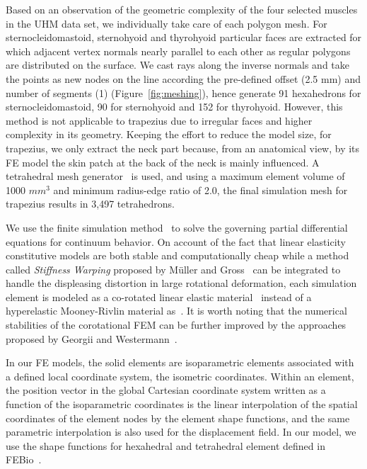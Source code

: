Based on an observation of the geometric complexity of the four selected muscles in the UHM data set, we individually take care of each polygon mesh. For sternocleidomastoid, sternohyoid and thyrohyoid particular faces are extracted for which adjacent vertex normals
nearly parallel to each other as regular polygons are distributed on the surface. We cast rays along the inverse normals and take the points as new nodes on the line according the pre-defined offset (2.5 mm) and number of segments (1) (Figure~\ref{fig:meshing}), hence generate 91 hexahedrons for sternocleidomastoid, 90 for sternohyoid and 152 for thyrohyoid. However, this method is not applicable to trapezius due to irregular faces and higher complexity in its geometry. Keeping the effort to reduce the model size, for trapezius, we only extract the neck part because, from an anatomical view, by its FE model the skin patch at the back of the neck is mainly influenced. A tetrahedral mesh generator~\cite{Si:2006:quality} is used, and using a maximum element volume of 1000 $mm^{3}$ and minimum radius-edge ratio of 2.0, the final simulation mesh for trapezius results in 3,497 tetrahedrons.

We use the finite simulation method~\cite{Cook:1995:finite} to solve the governing partial differential equations for continuum behavior. On account of the fact that linear elasticity constitutive models are both stable and computationally cheap while a method called \emph{Stiffness Warping} proposed by M\"{u}ller and Gross~\cite{Muller:2004:IVM} can be integrated to handle the displeasing distortion in large rotational deformation, each simulation element is modeled as a co-rotated linear elastic material~\cite{Muller:2004:IVM} instead of a hyperelastic Mooney-Rivlin material as~\cite{Lee:2009:CBM}. It is worth noting that the numerical stabilities of the corotational FEM can be further improved by the approaches proposed by Georgii and Westermann~\cite{Georgii:2008:corotated}.

In our FE models, the solid elements are isoparametric elements associated with a defined local coordinate system, the isometric coordinates. Within an element, the position vector in the global Cartesian coordinate system written as a function of the isoparametric coordinates is the linear interpolation of the spatial coordinates of the element nodes by the element shape functions, and the same parametric interpolation is also used for the displacement field. In our model, we use the shape functions for hexahedral and tetrahedral element defined in FEBio~\cite{Maas:2012:febio}.

